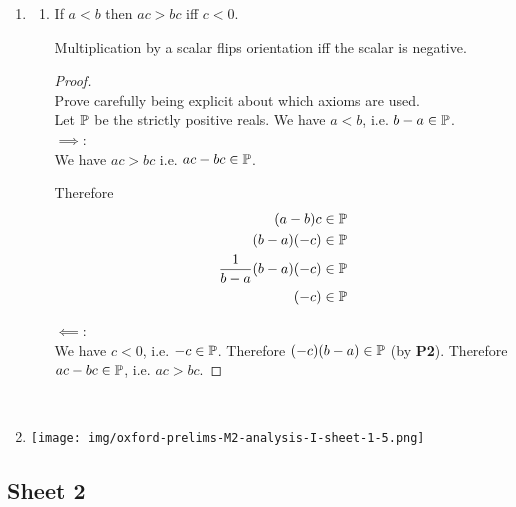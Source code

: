 \begin{enumerate}
\item
  \begin{enumerate}[label=(\alph*)]
  \item
    \newpage
    \begin{theorem*}
      If $a < b$ then $ac > bc$ iff $c < 0$.
    \end{theorem*}
    \begin{intuition*}
      Multiplication by a scalar flips orientation iff the scalar is negative.
    \end{intuition*}
    \begin{proof}~\\
       Prove carefully being explicit about which axioms are used.\\
      Let $\P$ be the strictly positive reals. We have $a < b$, i.e. $b - a \in \P$.\\
      $\implies$:\\
      We have $ac > bc$ i.e. $ac - bc \in \P$.

      Therefore
      \begin{align*}
        (a - b)c &\in \P\\
        (b - a)(-c) &\in \P\\
        \frac{1}{b-a}(b - a)(-c) &\in \P\\
        (-c) &\in \P
      \end{align*}

      $\impliedby$:\\
      We have $c < 0$, i.e. $-c \in \P$. Therefore $(-c)(b - a) \in \P$ (by {\bf P2}). Therefore
      $ac - bc \in \P$, i.e. $ac > bc$.
    \end{proof}
  \end{enumerate}~\\
\item

\begin{mdframed}
\texttt{[image: img/oxford-prelims-M2-analysis-I-sheet-1-5.png]}
\end{mdframed}
\end{enumerate}

\newpage
\subsection{Sheet 2}

